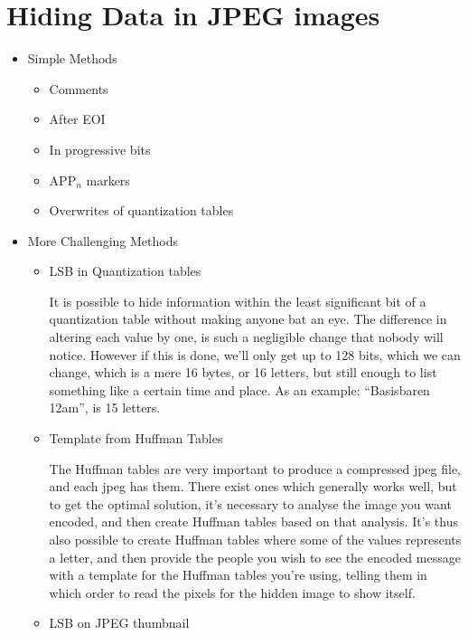 
\section{Hiding Data in JPEG images}

\begin{itemize}
	\item Simple Methods
	\begin{itemize}
		\item Comments
		\item After EOI
		\item In progressive bits
		\item APP$_n$ markers
		\item Overwrites of quantization tables
	\end{itemize}
	\item More Challenging Methods
	\begin{itemize}
		\item LSB in Quantization tables
		
		It is possible to hide information within the least significant bit of a quantization table without making anyone bat an eye. 
		The difference in altering each value by one, is such a negligible change that nobody will notice. 
		However if this is done, we'll only get up to 128 bits, which we can change, which is a mere 16 bytes, or 16 letters, but still enough to list something like a certain time and place. 
		As an example: ``Basisbaren 12am'', is 15 letters.
		\item Template from Huffman Tables
		
		The Huffman tables are very important to produce a compressed jpeg file, and each jpeg has them. 
		There exist ones which generally works well, but to get the optimal solution, it's necessary to analyse the image you want encoded, and then create Huffman tables based on that analysis. 
		It's thus also possible to create Huffman tables where some of the values represents a letter, and then provide the people you wish to see the encoded message with a template for the Huffman tables you're using, telling them in which order to read the pixels for the hidden image to show itself.
		\item LSB on JPEG thumbnail
		

\end{itemize}
\end{itemize}
